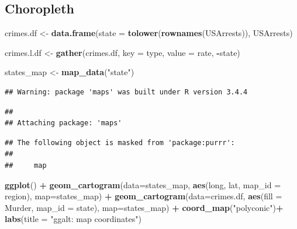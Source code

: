 \documentclass[]{krantz}
\makeatletter
\newenvironment{Shaded}{\begin{snugshade}}{\end{snugshade}}
\newcommand{\KeywordTok}[1]{\textcolor[rgb]{0.13,0.29,0.53}{\textbf{#1}}}
\newcommand{\DataTypeTok}[1]{\textcolor[rgb]{0.13,0.29,0.53}{#1}}
\newcommand{\StringTok}[1]{\textcolor[rgb]{0.31,0.60,0.02}{#1}}
\newcommand{\OperatorTok}[1]{\textcolor[rgb]{0.81,0.36,0.00}{\textbf{#1}}}
\newcommand{\NormalTok}[1]{#1}
\newenvironment{kframe}{%
\medskip{}
\setlength{\fboxsep}{.8em}
 \def\at@end@of@kframe{}%
 \ifinner\ifhmode%
  \def\at@end@of@kframe{\end{minipage}}%
  \begin{minipage}{\columnwidth}%
 \fi\fi%
 \def\FrameCommand##1{\hskip\@totalleftmargin \hskip-\fboxsep
 \colorbox{shadecolor}{##1}\hskip-\fboxsep
     \hskip-\linewidth \hskip-\@totalleftmargin \hskip\columnwidth}%
 \MakeFramed {\advance\hsize-\width
   \@totalleftmargin\z@ \linewidth\hsize
   \@setminipage}}%
 {\par\unskip\endMakeFramed%
 \at@end@of@kframe}
\renewenvironment{Shaded}{\begin{kframe}}{\end{kframe}}
\theoremstyle{definition}
\theoremstyle{definition}
\theoremstyle{definition}
\theoremstyle{remark}
\makeatother
\begin{document}
\subsection{Choropleth}\label{choropleth}

\begin{Shaded}
\begin{Highlighting}[]
\NormalTok{crimes.df <-}\StringTok{ }\KeywordTok{data.frame}\NormalTok{(}\DataTypeTok{state =} \KeywordTok{tolower}\NormalTok{(}\KeywordTok{rownames}\NormalTok{(USArrests)), USArrests)}

\NormalTok{crimes.l.df <-}\StringTok{ }\KeywordTok{gather}\NormalTok{(crimes.df, }\DataTypeTok{key =}\NormalTok{ type, }\DataTypeTok{value =}\NormalTok{ rate, }\OperatorTok{-}\NormalTok{state)}

\NormalTok{states_map <-}\StringTok{ }\KeywordTok{map_data}\NormalTok{(}\StringTok{"state"}\NormalTok{)}
\end{Highlighting}
\end{Shaded}

\begin{verbatim}
## Warning: package 'maps' was built under R version 3.4.4
\end{verbatim}

\begin{verbatim}
## 
## Attaching package: 'maps'
\end{verbatim}

\begin{verbatim}
## The following object is masked from 'package:purrr':
## 
##     map
\end{verbatim}

\begin{Shaded}
\begin{Highlighting}[]
\KeywordTok{ggplot}\NormalTok{() }\OperatorTok{+}
\StringTok{    }\KeywordTok{geom_cartogram}\NormalTok{(}\DataTypeTok{data=}\NormalTok{states_map, }\KeywordTok{aes}\NormalTok{(long, lat, }\DataTypeTok{map_id =}\NormalTok{ region), }\DataTypeTok{map=}\NormalTok{states_map) }\OperatorTok{+}
\StringTok{    }\KeywordTok{geom_cartogram}\NormalTok{(}\DataTypeTok{data=}\NormalTok{crimes.df, }\KeywordTok{aes}\NormalTok{(}\DataTypeTok{fill =}\NormalTok{ Murder, }\DataTypeTok{map_id =}\NormalTok{ state), }\DataTypeTok{map=}\NormalTok{states_map) }\OperatorTok{+}\StringTok{ }
\StringTok{    }\KeywordTok{coord_map}\NormalTok{(}\StringTok{"polyconic"}\NormalTok{)}\OperatorTok{+}
\StringTok{    }\KeywordTok{labs}\NormalTok{(}\DataTypeTok{title =} \StringTok{"ggalt: map coordinates"}\NormalTok{)}
\end{Highlighting}
\end{Shaded}
\end{document}
